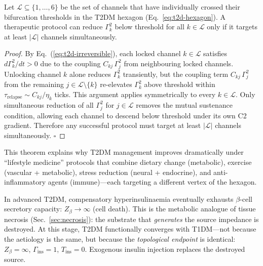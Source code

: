 \documentclass[aps,pre,twocolumn,superscriptaddress,floatfix]{revtex4-2}
\begin{document}
\begin{theorem}
\label{thm:t2d-treatment}
Let $\mathcal{L} \subseteq \{1,\ldots,6\}$
be the set of channels that have individually
crossed their bifurcation thresholds in the
T2DM hexagon (Eq.~\ref{eq:t2d-hexagon}).
A therapeutic protocol can reduce
$\Gamma_k^2$ below threshold for all
$k \in \mathcal{L}$ only if it targets at
least $|\mathcal{L}|$ channels simultaneously.

\end{theorem}

\begin{proof}
By Eq.~(\ref{eq:t2d-irreversible}), each locked
channel $k \in \mathcal{L}$ satisfies
$d\Gamma_k^2/dt > 0$ due to the coupling
$C_{kj}\,\Gamma_j^2$ from neighbouring locked channels.
Unlocking channel $k$ alone reduces $\Gamma_k^2$
transiently, but the coupling term
$C_{kj}\,\Gamma_j^2$ from the remaining
$j \in \mathcal{L}\setminus\{k\}$ re-elevates
$\Gamma_k^2$ above threshold within
$\tau_{\text{relapse}} \sim C_{kj}/\eta_k$ ticks.
This argument applies symmetrically to every
$k \in \mathcal{L}$.
Only simultaneous reduction of all
$\Gamma_j^2$ for $j \in \mathcal{L}$ removes
the mutual sustenance condition, allowing each
channel to descend below threshold under its own
C2 gradient.
Therefore any successful protocol must target
at least $|\mathcal{L}|$ channels simultaneously.
$\square$
\end{proof}

This theorem explains why T2DM management improves
dramatically under ``lifestyle medicine'' protocols
that combine dietary change (metabolic),
exercise (vascular + metabolic), stress reduction
(neural + endocrine), and anti-inflammatory agents
(immune)---each targeting a different vertex of
the hexagon.

\begin{remark}
\label{rem:beta-exhaustion}
In advanced T2DM, compensatory hyperinsulinaemia
eventually exhausts $\beta$-cell secretory
capacity: $Z_\beta \to \infty$ (cell death).
This is the metabolic analogue of tissue necrosis
(Sec.~\ref{sec:necrosis}): the substrate that
\emph{generates} the source impedance is destroyed.
At this stage, T2DM functionally converges with
T1DM---not because the aetiology is the same,
but because the \emph{topological endpoint} is
identical: $Z_\beta = \infty$,
$\Gamma_{\text{ins}} = 1$,
$T_{\text{ins}} = 0$.
Exogenous insulin injection replaces the destroyed
source.
\end{remark}
\end{document}
